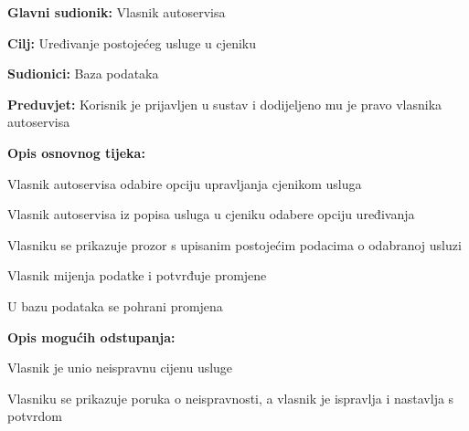 \noindent {}
\begin{packed_item}
	
	\item \textbf{Glavni sudionik: } Vlasnik autoservisa
	\item  \textbf{Cilj:} Uređivanje postojećeg usluge u cjeniku
	\item  \textbf{Sudionici:} Baza podataka
	\item  \textbf{Preduvjet:} Korisnik je prijavljen u sustav i dodijeljeno
	mu je pravo vlasnika autoservisa
	\item  \textbf{Opis osnovnog tijeka:}
	
	\item[] \begin{packed_enum}
		
		\item Vlasnik autoservisa odabire opciju upravljanja cjenikom usluga
		\item Vlasnik autoservisa iz popisa usluga u cjeniku odabere opciju
		uređivanja
		\item Vlasniku se prikazuje prozor s upisanim postojećim podacima o
		odabranoj usluzi
		\item Vlasnik mijenja podatke i potvrđuje promjene
		\item U bazu podataka se pohrani promjena
		
	\end{packed_enum}
	
	\item  \textbf{Opis mogućih odstupanja:}
	\item[] \begin{packed_item}
		\item[4.a] Vlasnik je unio neispravnu cijenu usluge
		\item[] \begin{packed_enum}
			\item Vlasniku se prikazuje poruka o neispravnosti, a vlasnik je
			ispravlja i nastavlja s potvrdom
		\end{packed_enum}
	\end{packed_item}
	
\end{packed_item}

